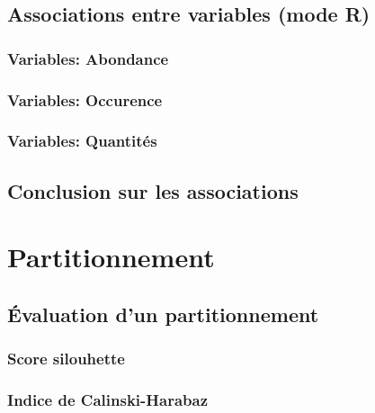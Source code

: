 \documentclass[]{book}
\begin{document}
\hypertarget{associations-entre-variables-mode-r}{%
\subsection{Associations entre variables (mode
R)}\label{associations-entre-variables-mode-r}}

\hypertarget{variables-abondance}{%
\subsubsection{Variables: Abondance}\label{variables-abondance}}

\hypertarget{variables-occurence}{%
\subsubsection{Variables: Occurence}\label{variables-occurence}}

\hypertarget{variables-quantituxe9s}{%
\subsubsection{Variables: Quantités}\label{variables-quantituxe9s}}

\hypertarget{conclusion-sur-les-associations}{%
\subsection{Conclusion sur les
associations}\label{conclusion-sur-les-associations}}

\hypertarget{partitionnement}{%
\section{Partitionnement}\label{partitionnement}}

\hypertarget{uxe9valuation-dun-partitionnement}{%
\subsection{Évaluation d'un
partitionnement}\label{uxe9valuation-dun-partitionnement}}

\hypertarget{score-silouhette}{%
\subsubsection{Score silouhette}\label{score-silouhette}}

\hypertarget{indice-de-calinski-harabaz}{%
\subsubsection{Indice de
Calinski-Harabaz}\label{indice-de-calinski-harabaz}}
\end{document}
